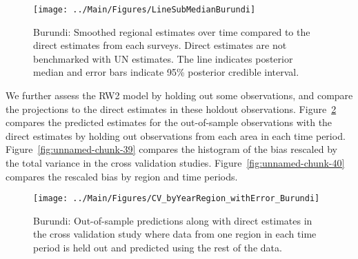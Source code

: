 \documentclass[12pt]{article}\usepackage[]{graphicx}\usepackage[]{color}
\newenvironment{knitrout}{}{} %
\begin{document}
\begin{knitrout}
\color{fgcolor}\begin{figure}[bht]

{\centering \texttt{[image: ../Main/Figures/LineSubMedianBurundi]} 

}

\caption[Burundi]{Burundi: Smoothed regional estimates over time compared to the direct estimates from each surveys. Direct estimates are not benchmarked with UN estimates. The line indicates posterior median and error bars indicate 95\% posterior credible interval.}\label{fig:unnamed-chunk-37}
\end{figure}


\end{knitrout}
We further assess the RW2 model by holding out some observations, and compare the projections to the direct estimates in these holdout observations. Figure~\ref{fig:unnamed-chunk-38} compares the predicted estimates for the out-of-sample observations  with the direct estimates by holding out observations from each area in each time period.  Figure~\ref{fig:unnamed-chunk-39} compares the histogram of the bias rescaled by the total variance in the cross validation studies. Figure~\ref{fig:unnamed-chunk-40} compares the rescaled bias by region and time periods.



 
\begin{knitrout}
\color{fgcolor}\begin{figure}[bht]

{\centering \texttt{[image: ../Main/Figures/CV\_byYearRegion\_withError\_Burundi]} 

}

\caption[Burundi]{Burundi: Out-of-sample predictions along with direct estimates in the cross validation study where data from one region in each time period is held out and predicted using the rest of the data.}\label{fig:unnamed-chunk-38}
\end{figure}


\end{knitrout}
\end{document}
